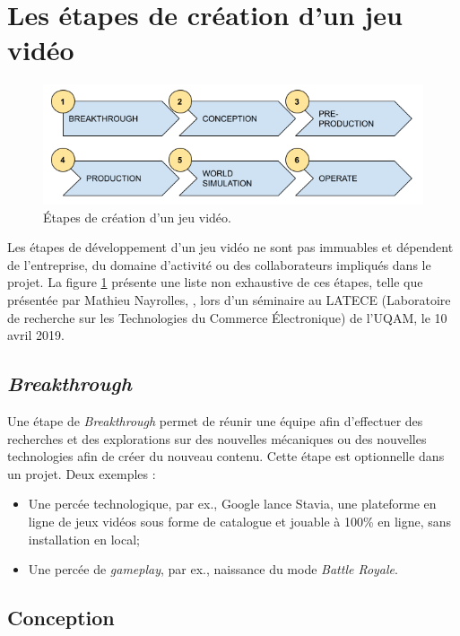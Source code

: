 \section{Les étapes de création d'un jeu vid\'eo}
\begin{figure}[H]
    \centering
    \includegraphics[width=14cm]{10_img/production_stages.png} 
    \caption{Étapes de création d'un jeu vidéo.}
    \label{fig.etapes}
\end{figure}

Les étapes de développement d'un jeu vidéo ne sont pas immuables et dépendent de l'entreprise, du domaine d'activité ou des collaborateurs impliqués dans le projet.
La figure \ref{fig.etapes} présente une liste non exhaustive de ces étapes, telle que présentée par Mathieu Nayrolles, , lors d’un séminaire au LATECE (Laboratoire de recherche sur les Technologies du Commerce Électronique) de l’UQAM, le 10 avril 2019.



\subsection{\emph{Breakthrough}}

Une étape de \emph{Breakthrough} permet de réunir une équipe afin d'effectuer des recherches et des explorations sur des nouvelles mécaniques ou des nouvelles technologies afin de créer du nouveau contenu.
Cette étape est optionnelle dans un projet.
Deux exemples :
\begin{itemize}
    \item Une percée technologique, par ex., Google lance Stavia, une plateforme en ligne de jeux vidéos sous forme de catalogue et jouable à 100\% en ligne, sans installation en local;
    \item Une percée de \emph{gameplay}, par ex., naissance du mode \emph{Battle Royale}.
\end{itemize}

\subsection{Conception}

